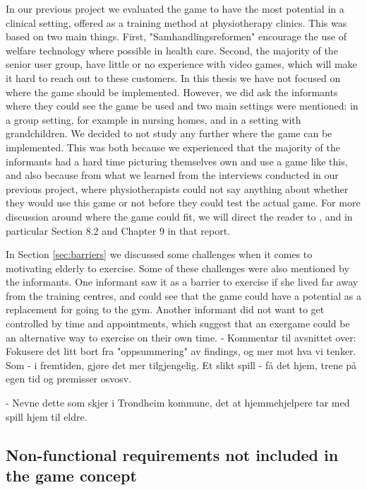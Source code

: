 In our previous project \cite{project} we evaluated the game to have the most potential in a clinical setting, offered as a training method at physiotherapy clinics. This was based on two main things. First, "Samhandlingsreformen" encourage the use of welfare technology where possible in health care. Second, the majority of the senior user group, have little or no experience with video games, which will make it hard to reach out to these customers. In this thesis we have not focused on where the game should be implemented. However, we did ask the informants where they could see the game be used and two main settings were mentioned: in a group setting, for example in nursing homes, and in a setting with grandchildren. We decided to not study any further where the game can be implemented. This was both because we experienced that the majority of the informants had a hard time picturing themselves own and use a game like this, and also because from what we learned from the interviews conducted in our previous project, where physiotherapists could not say anything about whether they would use this game or not before they could test the actual game. For more discussion around where the game could fit, we will direct the reader to \cite{project}, and in particular Section 8.2 and Chapter 9 in that report. 

In Section \ref{sec:barriers} we discussed some challenges when it comes to motivating elderly to exercise. Some of these challenges were also mentioned by the informants. One informant saw it as a barrier to exercise if she lived far away from the training centres, and could see that the game could have a potential as a replacement for going to the gym. Another informant did not want to get controlled by time and appointments, which suggest that an exergame could be an alternative way to exercise on their own time. 
- Kommentar til avsnittet over: Fokusere det litt bort fra "oppsummering" av findings, og mer mot hva vi tenker. Som - i fremtiden, gjøre det mer tilgjengelig. Et slikt spill - få det hjem, trene på egen tid og premisser osvosv. 


- Nevne dette som skjer i Trondheim kommune, det at hjemmehjelpere tar med spill hjem til eldre. 

\subsection{Non-functional requirements not included in the game concept}



